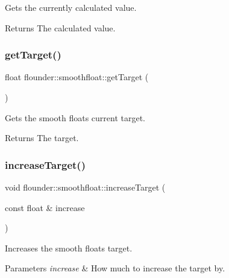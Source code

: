 Gets the currently calculated value. 

\begin{DoxyReturn}{Returns}
The calculated value. 
\end{DoxyReturn}
\mbox{\label{classflounder_1_1smoothfloat_ae84a7b55d9c4f66f8613966c104213b2}} 
\subsubsection{\texorpdfstring{get\+Target()}{getTarget()}}
{\footnotesize\ttfamily float flounder\+::smoothfloat\+::get\+Target (\begin{DoxyParamCaption}{ }\end{DoxyParamCaption})\hspace{0.3cm}{\ttfamily [inline]}}



Gets the smooth floats current target. 

\begin{DoxyReturn}{Returns}
The target. 
\end{DoxyReturn}
\mbox{\label{classflounder_1_1smoothfloat_a47a9df312c81c9a9c8f5bc8df3b886a1}} 
\subsubsection{\texorpdfstring{increase\+Target()}{increaseTarget()}}
{\footnotesize\ttfamily void flounder\+::smoothfloat\+::increase\+Target (\begin{DoxyParamCaption}\item[{const float \&}]{increase }\end{DoxyParamCaption})\hspace{0.3cm}{\ttfamily [inline]}}



Increases the smooth floats target. 


\begin{DoxyParams}{Parameters}
{\em increase} & How much to increase the target by. \\
\hline
\end{DoxyParams}
\mbox{\label{classflounder_1_1smoothfloat_a4e860cb265fb463b281442ee6c8d3b57}} 
